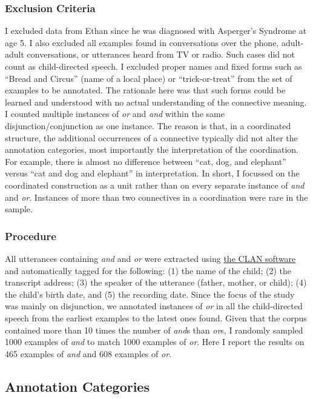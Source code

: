 \documentclass[oneside]{report}
\theoremstyle{definition}
\theoremstyle{definition}
\theoremstyle{definition}
\theoremstyle{remark}
\begin{document}
\subsubsection{Exclusion Criteria}\label{exclusion-criteria-1}

I excluded data from Ethan since he was diagnosed with Asperger's
Syndrome at age 5. I also excluded all examples found in conversations
over the phone, adult-adult conversations, or utterances heard from TV
or radio. Such cases did not count as child-directed speech. I excluded
proper names and fixed forms such as ``Bread and Circus'' (name of a
local place) or ``trick-or-treat'' from the set of examples to be
annotated. The rationale here was that such forms could be learned and
understood with no actual understanding of the connective meaning. I
counted multiple instances of \emph{or} and \emph{and} within the same
disjunction/conjunction as one instance. The reason is that, in a
coordinated structure, the additional occurrences of a connective
typically did not alter the annotation categories, most importantly the
interpretation of the coordination. For example, there is almost no
difference between ``cat, dog, and elephant'' versus ``cat and dog and
elephant'' in interpretation. In short, I focussed on the coordinated
construction as a unit rather than on every separate instance of
\emph{and} and \emph{or}. Instances of more than two connectives in a
coordination were rare in the sample.

\subsubsection{Procedure}\label{procedure-1}

All utterances containing \emph{and} and \emph{or} were extracted using
\href{http://alpha.talkbank.org/clan/}{the CLAN software} and
automatically tagged for the following: (1) the name of the child; (2)
the transcript address; (3) the speaker of the utterance (father,
mother, or child); (4) the child's birth date, and (5) the recording
date. Since the focus of the study was mainly on disjunction, we
annotated instances of \emph{or} in all the child-directed speech from
the earliest examples to the latest ones found. Given that the corpus
contained more than 10 times the number of \emph{and}s than \emph{or}s,
I randomly sampled 1000 examples of \emph{and} to match 1000 examples of
\emph{or}. Here I report the results on 465 examples of \emph{and} and
608 examples of \emph{or}.

\subsection{Annotation Categories}\label{annotation-categories}
\end{document}
